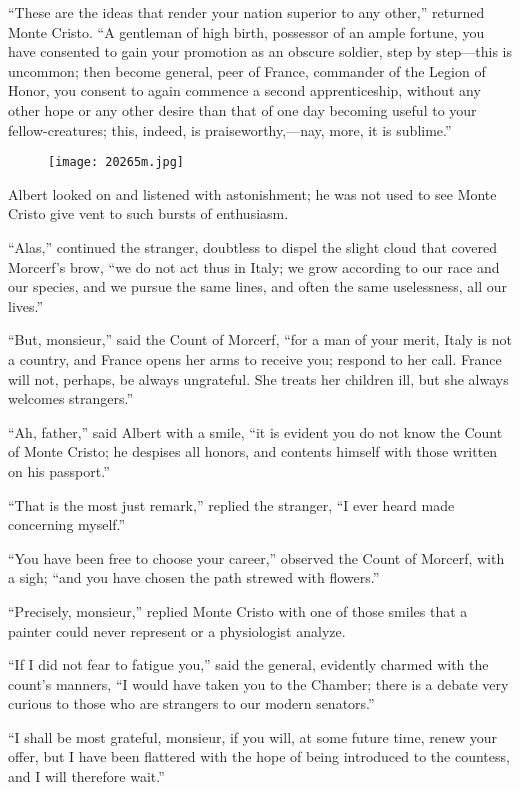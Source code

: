 “These are the ideas that render your nation superior to any other,”
returned Monte Cristo. “A gentleman of high birth, possessor of an
ample fortune, you have consented to gain your promotion as an obscure
soldier, step by step—this is uncommon; then become general, peer of
France, commander of the Legion of Honor, you consent to again commence
a second apprenticeship, without any other hope or any other desire
than that of one day becoming useful to your fellow-creatures; this,
indeed, is praiseworthy,—nay, more, it is sublime.”

\begin{figure}[ht]
\texttt{[image: 20265m.jpg]}
\end{figure}

Albert looked on and listened with astonishment; he was not used to see
Monte Cristo give vent to such bursts of enthusiasm.

“Alas,” continued the stranger, doubtless to dispel the slight cloud
that covered Morcerf’s brow, “we do not act thus in Italy; we grow
according to our race and our species, and we pursue the same lines,
and often the same uselessness, all our lives.”

“But, monsieur,” said the Count of Morcerf, “for a man of your merit,
Italy is not a country, and France opens her arms to receive you;
respond to her call. France will not, perhaps, be always ungrateful.
She treats her children ill, but she always welcomes strangers.”

“Ah, father,” said Albert with a smile, “it is evident you do not know
the Count of Monte Cristo; he despises all honors, and contents himself
with those written on his passport.”

“That is the most just remark,” replied the stranger, “I ever heard
made concerning myself.”

“You have been free to choose your career,” observed the Count of
Morcerf, with a sigh; “and you have chosen the path strewed with
flowers.”

“Precisely, monsieur,” replied Monte Cristo with one of those smiles
that a painter could never represent or a physiologist analyze.

“If I did not fear to fatigue you,” said the general, evidently charmed
with the count’s manners, “I would have taken you to the Chamber; there
is a debate very curious to those who are strangers to our modern
senators.”

“I shall be most grateful, monsieur, if you will, at some future time,
renew your offer, but I have been flattered with the hope of being
introduced to the countess, and I will therefore wait.”

